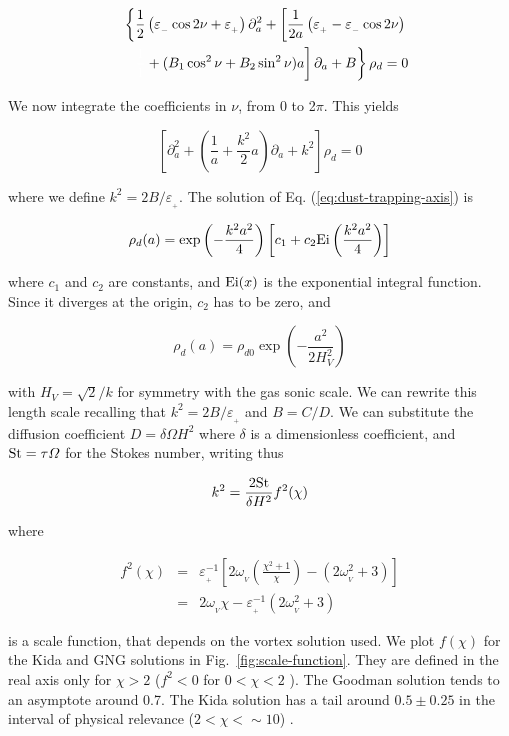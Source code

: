 \documentclass[apj]{emulateapj}
\def\white#1{\textcolor{white}{#1}}
\newcommand{\Eq}[1]{Eq. (\ref{#1})}
\newcommand{\eq}[1]{\Eq{#1}}
\newcommand{\Fig}[1]{Fig.~\ref{#1}}
\newcommand{\fig}[1]{\Fig{#1}}
\newcommand{\beq}{\begin{equation}}
\newcommand{\eeq}{\end{equation}}
\newcommand{\beqn}{\begin{eqnarray}}
\newcommand{\eeqn}{\end{eqnarray}}
\newcommand{\epsp}{\varepsilon_{_{+}}}
\newcommand{\epsm}{\varepsilon_{_{-}}}
\begin{document}
\beqn
&&\left\{\frac{1}{2}\left(\epsm \cos 2\nu +\epsp\right) \partial^2_a  +  \left[\frac{1}{2a}\left( \epsp - \epsm\cos 2\nu\right) \right.\right. \nonumber\\
&&\left.\left.\white{\frac{1}{1}}+ (B_1\cos^2\nu +  B_2\sin^2\nu)a\right] \partial_a  + B\right\} \rho_d = 0 
\eeqn

We now integrate the coefficients in $\nu$, from 0 to 2$\pi$. This yields


\beq\label{eq:dust-trapping-axis}
\left[\partial^2_a  +  \left(\frac{1}{a} +  \frac{k^2}{2}a\right) \partial_a  + k^2\right]\rho_d = 0 
\eeq

\noindent where we define $k^2=2B/\epsp$. The solution of
\eq{eq:dust-trapping-axis} is 

\beq
\rho_d(a) = \exp\left(-\frac{k^2a^2}{4}\right)  \left[c_1 + c_2 {\rm
    Ei}\left(\frac{k^2a^2}{4}\right)\right]
\eeq

\noindent where $c_1$ and $c_2$ are constants, and ${\rm Ei}(x)$ is the exponential integral function. 
Since it diverges at the origin, $c_2$ has to be zero, and 

\beq
\rho_d(a) = \rho_{d0} \exp\left(-\frac{a^2}{2H_V^2}\right)
\eeq

\noindent with $H_V = \sqrt{2}/k$ for symmetry with the gas sonic scale. We can 
rewrite this length scale recalling that $k^2=2B/\epsp$ and
$B=C/D$. We can substitute the diffusion coefficient $D=\delta \varOmega H^2$ where 
$\delta$ is a dimensionless coefficient, and ${\rm St} = \tau\varOmega$ for 
the Stokes number, writing thus 

\beqn
\label{eq:k}
k^2 = \frac{2{\rm St}}{\delta H^2} f^2(\chi)
\eeqn 

\noindent where 

\beqn
f^2(\chi) &=& \epsp^{-1} \left[2\omega_{_V}\left(\frac{\chi^2+1}{\chi}\right) - (2\omega_{_V}^2 + 3) \right]\nonumber \\
          &=& 2\omega_{_V}\chi - \epsp^{-1}(2\omega_{_V}^2 + 3)
\eeqn

\noindent is a scale function, that depends on the vortex solution
used. We plot $f(\chi)$ for the Kida and GNG solutions in
\fig{fig:scale-function}. They are defined in the real axis only for $\chi > 2$ ($f^2
< 0$ for $0 < \chi < 2$ ). The Goodman solution tends to an asymptote
around 0.7. The Kida solution has a  tail around $0.5\pm0.25$ in the
interval of physical relevance ($2 < \chi <\sim 10$) .
\end{document}
